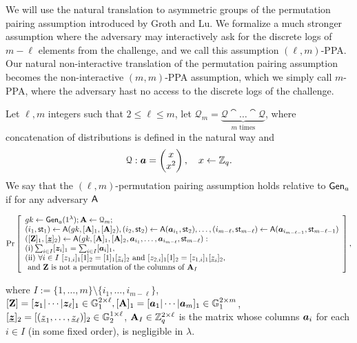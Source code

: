
We will use the natural translation to asymmetric groups of the permutation pairing assumption introduced by Groth and Lu. We formalize a much stronger assumption where the adversary may interactively ask for the discrete logs of $m-\ell$ elements from the challenge, and we call this assumption $(\ell,m)$-PPA.
Our natural non-interactive translation of the permutation pairing assumption becomes the non-interactive $(m,m)$-PPA assumption, which we simply call $m$-PPA, where the adversary hast no access to the discrete logs of the challenge.
\begin{definition}\label{def:ppa}
Let $\ell,m$ integers such that $2\leq \ell \leq m$, let $\mathcal{Q}_{m}=\underbrace{\mathcal{Q}\cat\ldots\cat\mathcal{Q}}_{m\text{ times}}$, where concatenation of  distributions is defined in the natural way and 
$$\mathcal{Q}: {\boldsymbol{a}}=\left(\begin{matrix}x\\x^2\end{matrix}\right),\quad x\gets\mathbb{Z}_q.$$
We say that the $(\ell,m)$-permutation pairing assumption holds relative to $\mathsf{Gen}_a$ if for any adversary $\mathsf{A}$
\begin{small}$$
\Pr\left[
\begin{array}{l}
	gk\gets\mathsf{Gen}_a(1^\lambda);\mathbf{{A}}\gets\mathcal{Q}_{m};\\
	(i_1,\mathsf{st}_1) \gets \mathsf{A}(gk,[\mathbf{{A}}]_1,[\mathbf{{A}}]_2),
	(i_2,\mathsf{st}_2) \gets \mathsf{A}({\boldsymbol{a}}_{i_1},\mathsf{st}_2),
	\ldots,
	(i_{m-\ell},\mathsf{st}_{m-\ell}) \gets \mathsf{A}({\boldsymbol{a}}_{i_{m-\ell-1}},\mathsf{st}_{m-\ell-1})\\
	([\mathbf{{Z}}]_1,[\underline{{\boldsymbol{z}}}]_2)\gets\mathsf{A}(gk,[\mathbf{{A}}]_1,[\mathbf{{A}}]_2, {\boldsymbol{a}}_{i_1},\ldots, {\boldsymbol{a}}_{i_{m-\ell}},\mathsf{st}_{m-\ell}):\\
	\mathrm{(i)} \sum_{i\in I}[{\boldsymbol{z}}_i]_1 = \sum_{i\in I}[{\boldsymbol{a}}_i]_1,\\
	\mathrm{(ii)}\ \forall i\in I \ [z_{1,i}]_1[1]_2=[1]_1[\underline{z}_{i}]_2 \text{ and } [z_{2,i}]_1[1]_2=[z_{1,i}]_1[\underline{z}_{i}]_2,\\
	\text{ and }\mathbf{{Z}}\text{ is not a permutation of the columns of }\mathbf{{A}}_I
\end{array}
\right],
$$\end{small}
where $I:=\{1,\ldots, m\}\setminus \{i_1,\ldots, i_{m-\ell} \}$, $[\mathbf{{Z}}]=[{\boldsymbol{z}}_1|\cdots|{\boldsymbol{z}}_\ell]_1\in\mathbb{G}_1^{2\times \ell}, [\mathbf{{A}}]_1=[{\boldsymbol{a}}_1|\cdots|{\boldsymbol{a}}_m]_1\in\mathbb{G}_1^{2\times m}$, $[\underline{{\boldsymbol{z}}}]_2=\allowbreak[(\underline{z}_1,\ldots,\allowbreak \underline{z}_\ell)]_2\in\mathbb{G}_2^{1\times \ell}$,
$\mathbf{{A}}_I\in \mathbb{Z}_q^{2\times \ell}$ is the matrix whose columns ${\boldsymbol{a}}_i$ for each $i\in I$ (in some fixed order),
 is negligible in $\lambda$.
\end{definition}

